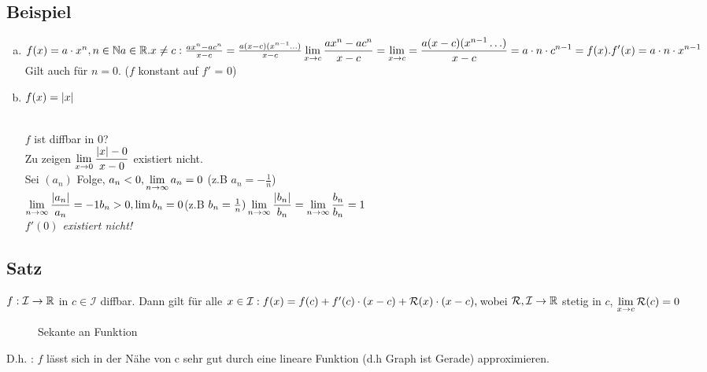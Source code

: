 \subsection{Beispiel}\label{sec:6.2}
\begin{enumerate}[a)]
\item $f(x) = a \cdot x^n , n \in \mathbb{N} a \in \mathbb{R}.\\
x \neq c: \frac{ax^n-ac^n}{x-c} = \frac{a(x-c)(x^{n-1}\ldots)}{x-c}\\
\displaystyle \lim_{x \to c} \frac{ax^n-ac^n}{x-c} = \displaystyle \lim_{x \to c} = \frac{a(x-c)(x^{n-1}\ldots)}{x-c} = a \cdot n \cdot c^{n-1} = f(x).\\
f'(x) = a \cdot n \cdot x^{n-1}$ Gilt auch für $n=0$. ($f$ konstant auf $f'$ = 0)
\item $f(x) = \lvert x \rvert$\\
\\
$f$ ist diffbar in 0?\\
Zu zeigen $\displaystyle \lim_{x \to 0} \frac{\lvert x \rvert-0}{x-0}$ existiert nicht. \\
Sei $(a_n)$ Folge, $a_n < 0 , \displaystyle \lim_{n \to \infty} a_n = 0$ (z.B $a_n = -\frac{1}{n}$)\\
$\displaystyle \lim_{n \to \infty} \frac{\lvert a_n \rvert}{a_n} = -1\\
b_n > 0 , \lim b_n = 0 $(z.B $b_n = \frac{1}{n})\\
\displaystyle \lim_{n \to \infty} \frac{\lvert b_n \rvert}{b_n} = \displaystyle \lim_{n \to \infty} \frac{b_n}{b_n} =1$\\
{\em $f'(0)$ existiert nicht!}
\end{enumerate}
\subsection[Satz:]{Satz}\label{sec:6.3}
$f: \mathcal{I} \to \mathbb{R} $ in $c \in \mathcal{I}$ diffbar.
Dann gilt für alle $x \in \mathcal{I}:\\
f(x) = f(c) + f'(c) \cdot (x-c) + \mathcal{R}(x) \cdot (x-c), \,\\
$wobei $\mathcal{R}, \mathcal{I} \to \mathbb{R}$ stetig in $c$, $\displaystyle \lim_{x \to c}\mathcal{R}(c) = 0$\\
\begin{figure}[h!]
	\centering
	\caption{Sekante an Funktion}
\end{figure}
D.h. : $f$ lässt sich in der Nähe von c sehr gut durch eine lineare Funktion (d.h Graph ist Gerade) approximieren.
